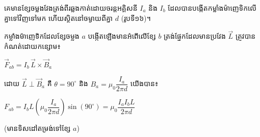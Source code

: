 \noindent
គេមានខ្សែចម្លងវែងត្រង់ពីរឆ្លងកាត់ដោយចរន្តអគ្គិសនី $I_a$ និង $I_b$ ដែលបានបង្កើតកម្លាំងម៉ាញេទិកលើគ្នាទៅវិញទៅមក ហើយស្ថិតនៅចម្ងាយពីគ្នា $d$ (រូបទី១៦)។


\noindent
\begin{minipage}[t]{0.55\textwidth}
	\raggedright
	កម្លាំងម៉ាញេទិកដែលខ្សែចម្លង $a$ បង្កើតឡើងមានអំពើលើខ្សែ $b$ ត្រង់ផ្នែកដែលមានប្រវែង $\vec{L}$ ត្រូវបានកំណត់ដោយកន្សោម៖

	\vspace{0.4em}
	\begin{center}
		$\vec{F}_{ab} = I_b\,\vec{L}\times\vec{B}_a$
	\end{center}

	\vspace{0.4em}
	ដោយ $\vec{L}\perp\vec{B}_a$ គឺ $\theta = 90^{\circ}$ និង $B_a = \mu_0\dfrac{I_a}{2\pi d}$ យើងបាន៖

	\vspace{0.4em}
	\begin{center}
		$F_{ab} = I_bL\left(\mu_0\dfrac{I_a}{2\pi d}\right)\sin(90^{\circ}) = \mu_0\dfrac{I_aI_bL}{2\pi d}$
	\end{center}

	\vspace{0.3em}
	(មានទិសដៅតម្រង់ទៅខ្សែ $a$)
\end{minipage}%
\hfill
\begin{minipage}[t]{0.40\textwidth}
	\vspace{0pt}
	\hspace*{0.5em}%
\end{minipage}

\vspace{0.7em}

